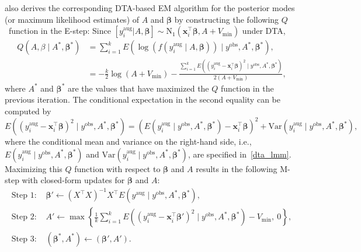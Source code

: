 \documentclass[12pt]{article}
\begin{document}
\begin{appendix}
\citet{kelly2014advances} also derives the corresponding DTA-based EM algorithm for the posterior modes (or maximum likelihood estimates) of $A$ and $\boldsymbol{\beta}$ by constructing the following $Q$~function in the E-step: Since $[y^{\textrm{aug}}_i\vert A, \boldsymbol{\beta}] \sim \textrm{N}_1(\boldsymbol{x}^\top_i \boldsymbol{\beta}, A+V_{\min})$ under DTA,
\begin{align}\nonumber
Q(A, \beta\mid A^\ast, \boldsymbol{\beta}^\ast)&=\sum_{i=1}^kE(\log(f(y^{\textrm{aug}}_i\mid A, \boldsymbol{\beta}))\mid y^{\textrm{obs}}, A^\ast, \boldsymbol{\beta}^\ast),\nonumber\\
&=-\frac{k}{2}\log(A+V_{\min})-\frac{\sum_{i=1}^kE\left( (y^{\textrm{aug}}_i-\boldsymbol{x}^\top_i\boldsymbol{\beta})^2\mid y^{\textrm{obs}}, A^\ast, \boldsymbol{\beta}^\ast\right)}{2(A+V_{\min})}\nonumber,
\end{align}
where $A^\ast$ and $\boldsymbol{\beta}^\ast$ are the values that have maximized the $Q$ function in the previous iteration. The conditional expectation in the second equality can be computed by
\begin{equation}
E\left( (y^{\textrm{aug}}_i-\boldsymbol{x}^\top_i\boldsymbol{\beta})^2\mid y^{\textrm{obs}}, A^\ast, \boldsymbol{\beta}^\ast\right)=\left( E(y^{\textrm{aug}}_i\mid y^{\textrm{obs}}, A^\ast, \boldsymbol{\beta}^\ast)-\boldsymbol{x}^\top_i\boldsymbol{\beta}\right)^2+\textrm{Var}(y^{\textrm{aug}}_i\mid y^{\textrm{obs}}, A^\ast, \boldsymbol{\beta}^\ast)\nonumber,
\end{equation}
where the conditional mean and variance on the right-hand side, i.e., $E(y^{\textrm{aug}}_i\mid y^{\textrm{obs}}, A^\ast, \boldsymbol{\beta}^\ast)$ and $\textrm{Var}(y^{\textrm{aug}}_i\mid y^{\textrm{obs}}, A^\ast, \boldsymbol{\beta}^\ast)$, are specified in~\eqref{dta_lmm}. Maximizing this $Q$ function with respect to $\boldsymbol{\beta}$ and $A$ results in the following M-step with closed-form updates for $\boldsymbol{\beta}$ and $A$:
\begin{align}
\textrm{Step 1: }& \boldsymbol{\beta}'\gets(X^\top X)^{-1}X^\top E(y^{\textrm{aug}}\mid y^{\textrm{obs}}, A^\ast, \boldsymbol{\beta}^\ast)\nonumber,\\
\textrm{Step 2: }&A'\gets\max\left\{\frac{1}{k}\sum_{i=1}^kE\left( (y^{\textrm{aug}}_i-\boldsymbol{x}^\top_i\boldsymbol{\beta}')^2\mid y^{\textrm{obs}}, A^\ast, \boldsymbol{\beta}^\ast\right)-V_{\min},~ 0\right\}\nonumber,\\
\textrm{Step 3: }&(\boldsymbol{\beta}^\ast, A^\ast)\gets (\boldsymbol{\beta}', A')\nonumber.
\end{align}


\end{appendix}
\end{document}
